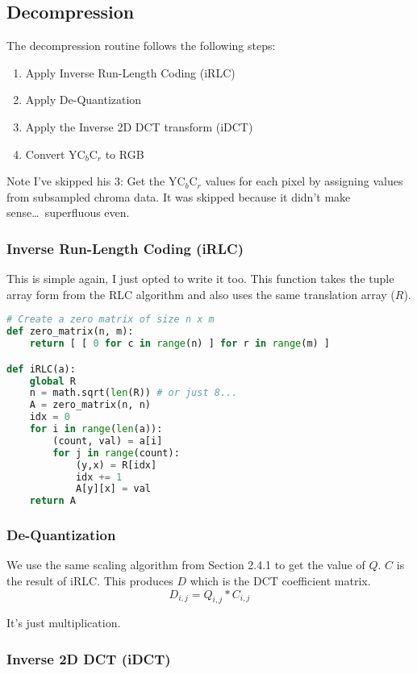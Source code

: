 \documentclass{article}
\begin{document}
\subsection{Decompression}

The decompression routine follows the following steps:
\begin{enumerate}
\item Apply Inverse Run-Length Coding (iRLC)
\item Apply De-Quantization
\item Apply the Inverse 2D DCT transform (iDCT)
\item Convert $\text{YC}_{b}\text{C}_{r}$ to RGB
\end{enumerate}

\noindent
Note I've skipped his 3: Get the $\text{YC}_{b}\text{C}_{r}$
values for each pixel by assigning values from subsampled chroma data.
It was skipped because it didn't make sense\ldots\ superfluous even.

\subsubsection{Inverse Run-Length Coding (iRLC)}

This is simple again, I just opted to write it too.
This function takes the tuple array form from the RLC
algorithm and also uses the same translation array ($R$).

\begin{lstlisting}[language=python]
# Create a zero matrix of size n x m
def zero_matrix(n, m):
	return [ [ 0 for c in range(n) ] for r in range(m) ]

def iRLC(a):
	global R
	n = math.sqrt(len(R)) # or just 8...
	A = zero_matrix(n, n)
	idx = 0
	for i in range(len(a)):
		(count, val) = a[i]
		for j in range(count):
			(y,x) = R[idx]
			idx += 1
			A[y][x] = val
	return A
\end{lstlisting}

\subsubsection{De-Quantization}

We use the same scaling algorithm from Section 2.4.1
to get the value of $Q$. $C$ is the result of iRLC.
This produces $D$ which is the DCT coefficient matrix.
\[
D_{i,j} = Q_{i,j} * C_{i,j}
\]

It's just multiplication.

\subsubsection{Inverse 2D DCT (iDCT)}
\end{document}
